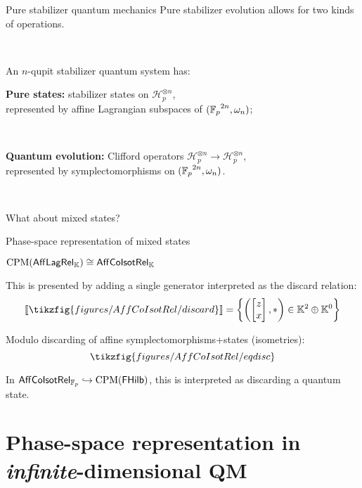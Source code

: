 \documentclass{beamer}
\begin{document}
\begin{frame}{Pure stabilizer quantum mechanics}
Pure stabilizer evolution allows for two kinds of operations.

\

An \(n\)-qupit stabilizer quantum system has:
\begin{description}
\item \textbf{Pure states:} stabilizer states on \(\mathcal{H}_p^{\otimes n}\),\\ represented by affine Lagrangian subspaces of \(({\mathbb{F}_p}^{2n}, \omega_n)\);

\

\item \textbf{Quantum evolution:} Clifford operators \(\mathcal{H}_p^{\otimes n}\to \mathcal{H}_p^{\otimes n}\),\\  represented by symplectomorphisms on \(({\mathbb{F}_p}^{2n}, \omega_n)\).
\end{description}

\

What about mixed states?
\end{frame}

\begin{frame}{Phase-space representation of mixed states}

\begin{theorem}
\(\CPM(\ALR) \cong \ACR\)
\end{theorem}

This is presented by adding a single generator interpreted as the discard relation:
\[\interp{\tikzfig{figures/AffCoIsotRel/discard}} = \left\{\left( \begin{bmatrix}z\\x \end{bmatrix}, *\right) \in \K^2\oplus \K^0\right\}\]

Modulo discarding of affine symplectomorphisms+states (isometries):
\[\tikzfig{figures/AffCoIsotRel/eqdisc}\]

In \(\ACR[\Zp]\hookrightarrow\CPM(\FHilb)\), this is interpreted as discarding a quantum state.
\end{frame}



\section{Phase-space representation in \emph{infinite}-dimensional QM}
\end{document}
